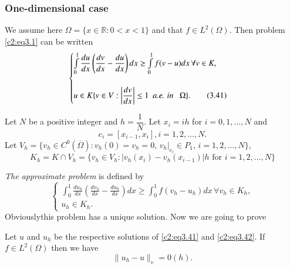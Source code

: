  \subsubsection{One-dimensional case}\label{c2:sss3.7.1}%
 
 We assume here $\Omega = \{x \in \mathbb{R} : 0 < x < 1 \}$ and
 that $f \in L^2 (\Omega)$. Then problem \eqref{c2:eq3.1} can be written  
\begin{equation} 
\begin{cases}
\int\limits^1_0 \dfrac{du}{dx} \left(\dfrac{dv}{dx} - \dfrac{du}{dx} \right) dx
\geq \int\limits^1 _0 f (v-u) dx\, \forall  v \in K,\\
&\\
u \in K \{v \in V : \left|\dfrac{dv}{dx}\right| \leq 1 ~~ \text{\em
  a.e. in }~~ \Omega \}.\tag{3.41}\label{c2:eq3.41} 
\end{cases}
 \end{equation}
 
 Let $N$ be a positive integer and $h = \dfrac{1}{N}$. Let $x_i = ih$
 for $i=0, 1, \ldots, N$ and  
 $$
 e_i = [x_{ i - 1}, x_i], i = 1, 2, \ldots, N.
 $$  
 Let $V_h = \{v_h \in C^0 (\overline{\Omega}) : v_h (0) = v_h =
 0$, $v_h |_{e_i} \in P_1$, $i=1, 2, \ldots, N\}$,  
 $$
 K_h = K \cap V_h = \{v_h \in V_h : | v_h (x_i ) - v_h (x_{i -
   1}) | h \text{ for } i=1, 2, \ldots, N \} 
 $$
 
\textit{The approximate problem} is defined  by
\begin{equation}
\begin{cases}
\int^1_0 \frac{du_h}{dx} \left(  \frac{dv_h}{dx} - \frac{du_h}{dx}
\right) dx \geq \int^1_0 f (v_h - u_h) dx\, \forall  v_h \in K_h,\\ 
u_h \in K_h.\tag{3.42}\label{c2:eq3.42}
\end{cases}
\end{equation} 
Obviously\pageoriginale  this problem  has a unique solution. Now we are going  to
prove  

\begin{theorem}\label{c2:thm3.4}%
Let $u$ and $u_h$ be the respective solutions of \eqref{c2:eq3.41} and
\eqref{c2:eq3.42}. If  $f \in L^2 (\Omega)$ then we have  
$$
\parallel u_h - u\parallel_v = 0(h).
$$
\end{theorem}

